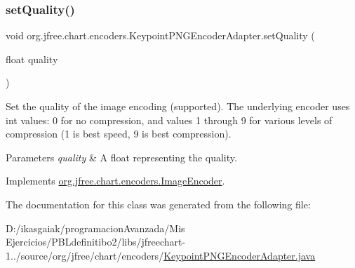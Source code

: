 \subsubsection{\texorpdfstring{set\+Quality()}{setQuality()}}
{\footnotesize\ttfamily void org.\+jfree.\+chart.\+encoders.\+Keypoint\+P\+N\+G\+Encoder\+Adapter.\+set\+Quality (\begin{DoxyParamCaption}\item[{float}]{quality }\end{DoxyParamCaption})}

Set the quality of the image encoding (supported). The underlying encoder uses int values\+: 0 for no compression, and values 1 through 9 for various levels of compression (1 is best speed, 9 is best compression).


\begin{DoxyParams}{Parameters}
{\em quality} & A float representing the quality. \\
\hline
\end{DoxyParams}


Implements \mbox{\hyperlink{interfaceorg_1_1jfree_1_1chart_1_1encoders_1_1_image_encoder_a143bbe40d39b16192a92128696877782}{org.\+jfree.\+chart.\+encoders.\+Image\+Encoder}}.



The documentation for this class was generated from the following file\+:\begin{DoxyCompactItemize}
\item 
D\+:/ikasgaiak/programacion\+Avanzada/\+Mis Ejercicios/\+P\+B\+Ldefinitibo2/libs/jfreechart-\/1../source/org/jfree/chart/encoders/\mbox{\hyperlink{_keypoint_p_n_g_encoder_adapter_8java}{Keypoint\+P\+N\+G\+Encoder\+Adapter.\+java}}\end{DoxyCompactItemize}
